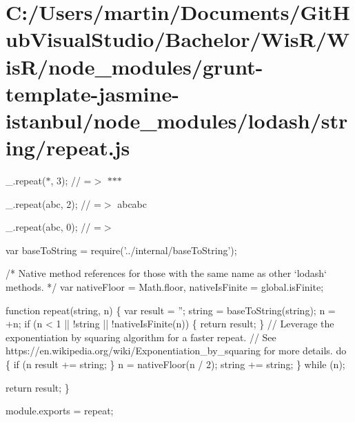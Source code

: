 \hypertarget{_c_1_2_users_2martin_2_documents_2_git_hub_visual_studio_2_bachelor_2_wis_r_2_wis_r_2node_moduled75a3cfc86d17e579752ee2aa56d87ab}{}\section{C\+:/\+Users/martin/\+Documents/\+Git\+Hub\+Visual\+Studio/\+Bachelor/\+Wis\+R/\+Wis\+R/node\+\_\+modules/grunt-\/template-\/jasmine-\/istanbul/node\+\_\+modules/lodash/string/repeat.\+js}
\+\_\+.\+repeat(\textquotesingle{}$\ast$\textquotesingle{}, 3); // =$>$ \textquotesingle{}$\ast$$\ast$$\ast$\textquotesingle{}

\+\_\+.\+repeat(\textquotesingle{}abc\textquotesingle{}, 2); // =$>$ \textquotesingle{}abcabc\textquotesingle{}

\+\_\+.\+repeat(\textquotesingle{}abc\textquotesingle{}, 0); // =$>$ \textquotesingle{}\textquotesingle{}


\begin{DoxyCodeInclude}
var baseToString = require(\textcolor{stringliteral}{'../internal/baseToString'});

\textcolor{comment}{/* Native method references for those with the same name as other `lodash` methods. */}
var nativeFloor = Math.floor,
    nativeIsFinite = global.isFinite;

\textcolor{keyword}{function} repeat(\textcolor{keywordtype}{string}, n) \{
  var result = \textcolor{stringliteral}{''};
  \textcolor{keywordtype}{string} = baseToString(\textcolor{keywordtype}{string});
  n = +n;
  \textcolor{keywordflow}{if} (n < 1 || !\textcolor{keywordtype}{string} || !nativeIsFinite(n)) \{
    \textcolor{keywordflow}{return} result;
  \}
  \textcolor{comment}{// Leverage the exponentiation by squaring algorithm for a faster repeat.}
  \textcolor{comment}{// See https://en.wikipedia.org/wiki/Exponentiation\_by\_squaring for more details.}
  \textcolor{keywordflow}{do} \{
    \textcolor{keywordflow}{if} (n %
      result += string;
    \}
    n = nativeFloor(n / 2);
    \textcolor{keywordtype}{string} += string;
  \} \textcolor{keywordflow}{while} (n);

  \textcolor{keywordflow}{return} result;
\}

module.exports = repeat;
\end{DoxyCodeInclude}
 